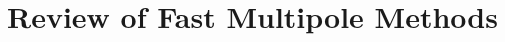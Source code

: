
\chapter{Review of Fast Multipole Methods}\label{chpt:fmm}
\thispagestyle{chaptertitle} %











